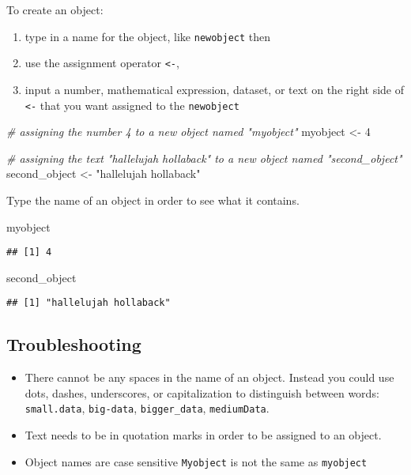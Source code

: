 \documentclass[]{book}
\newenvironment{Shaded}{\begin{snugshade}}{\end{snugshade}}
\newcommand{\DecValTok}[1]{\textcolor[rgb]{0.00,0.00,0.81}{{#1}}}
\newcommand{\StringTok}[1]{\textcolor[rgb]{0.31,0.60,0.02}{{#1}}}
\newcommand{\CommentTok}[1]{\textcolor[rgb]{0.56,0.35,0.01}{\textit{{#1}}}}
\newcommand{\NormalTok}[1]{{#1}}
\providecommand{\tightlist}{%
  \setlength{\itemsep}{0pt}\setlength{\parskip}{0pt}}
\begin{document}
To create an object:

\begin{enumerate}
\def\labelenumi{\arabic{enumi}.}
\tightlist
\item
  type in a name for the object, like \texttt{newobject} then
\item
  use the assignment operator \texttt{\textless{}-},
\item
  input a number, mathematical expression, dataset, or text on the right
  side of \texttt{\textless{}-} that you want assigned to the
  \texttt{newobject}
\end{enumerate}

\begin{Shaded}
\begin{Highlighting}[]
\CommentTok{# assigning the number 4 to a new object named "myobject"}
\NormalTok{myobject <-}\StringTok{ }\DecValTok{4}

\CommentTok{# assigning the text "hallelujah hollaback" to a new object named "second_object"}
\NormalTok{second_object <-}\StringTok{ "hallelujah hollaback"}
\end{Highlighting}
\end{Shaded}

Type the name of an object in order to see what it contains.

\begin{Shaded}
\begin{Highlighting}[]
\NormalTok{myobject}
\end{Highlighting}
\end{Shaded}

\begin{verbatim}
## [1] 4
\end{verbatim}

\begin{Shaded}
\begin{Highlighting}[]
\NormalTok{second_object}
\end{Highlighting}
\end{Shaded}

\begin{verbatim}
## [1] "hallelujah hollaback"
\end{verbatim}

\subsection{Troubleshooting}\label{troubleshooting-1}

\begin{itemize}
\tightlist
\item
  There cannot be any spaces in the name of an object. Instead you could
  use dots, dashes, underscores, or capitalization to distinguish
  between words: \texttt{small.data}, \texttt{big-data},
  \texttt{bigger\_data}, \texttt{mediumData}.
\item
  Text needs to be in quotation marks in order to be assigned to an
  object.
\item
  Object names are case sensitive \texttt{Myobject} is not the same as
  \texttt{myobject}
\end{itemize}
\end{document}
